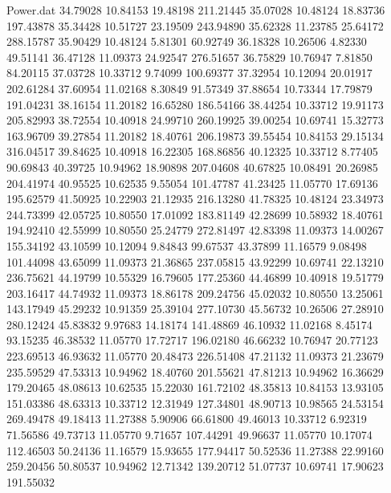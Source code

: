 \begin{filecontents}{Power.dat}
  34.79028   10.84153   19.48198  211.21445
  35.07028   10.48124   18.83736  197.43878
  35.34428   10.51727   23.19509  243.94890
  35.62328   11.23785   25.64172  288.15787
  35.90429   10.48124    5.81301   60.92749
  36.18328   10.26506    4.82330   49.51141
  36.47128   11.09373   24.92547  276.51657
  36.75829   10.76947    7.81850   84.20115
  37.03728   10.33712    9.74099  100.69377
  37.32954   10.12094   20.01917  202.61284
  37.60954   11.02168    8.30849   91.57349
  37.88654   10.73344   17.79879  191.04231
  38.16154   11.20182   16.65280  186.54166
  38.44254   10.33712   19.91173  205.82993
  38.72554   10.40918   24.99710  260.19925
  39.00254   10.69741   15.32773  163.96709
  39.27854   11.20182   18.40761  206.19873
  39.55454   10.84153   29.15134  316.04517
  39.84625   10.40918   16.22305  168.86856
  40.12325   10.33712    8.77405   90.69843
  40.39725   10.94962   18.90898  207.04608
  40.67825   10.08491   20.26985  204.41974
  40.95525   10.62535    9.55054  101.47787
  41.23425   11.05770   17.69136  195.62579
  41.50925   10.22903   21.12935  216.13280
  41.78325   10.48124   23.34973  244.73399
  42.05725   10.80550   17.01092  183.81149
  42.28699   10.58932   18.40761  194.92410
  42.55999   10.80550   25.24779  272.81497
  42.83398   11.09373   14.00267  155.34192
  43.10599   10.12094    9.84843   99.67537
  43.37899   11.16579    9.08498  101.44098
  43.65099   11.09373   21.36865  237.05815
  43.92299   10.69741   22.13210  236.75621
  44.19799   10.55329   16.79605  177.25360
  44.46899   10.40918   19.51779  203.16417
  44.74932   11.09373   18.86178  209.24756
  45.02032   10.80550   13.25061  143.17949
  45.29232   10.91359   25.39104  277.10730
  45.56732   10.26506   27.28910  280.12424
  45.83832    9.97683   14.18174  141.48869
  46.10932   11.02168    8.45174   93.15235
  46.38532   11.05770   17.72717  196.02180
  46.66232   10.76947   20.77123  223.69513
  46.93632   11.05770   20.48473  226.51408
  47.21132   11.09373   21.23679  235.59529
  47.53313   10.94962   18.40760  201.55621
  47.81213   10.94962   16.36629  179.20465
  48.08613   10.62535   15.22030  161.72102
  48.35813   10.84153   13.93105  151.03386
  48.63313   10.33712   12.31949  127.34801
  48.90713   10.98565   24.53154  269.49478
  49.18413   11.27388    5.90906   66.61800
  49.46013   10.33712    6.92319   71.56586
  49.73713   11.05770    9.71657  107.44291
  49.96637   11.05770   10.17074  112.46503
  50.24136   11.16579   15.93655  177.94417
  50.52536   11.27388   22.99160  259.20456
  50.80537   10.94962   12.71342  139.20712
  51.07737   10.69741   17.90623  191.55032

\end{filecontents}
